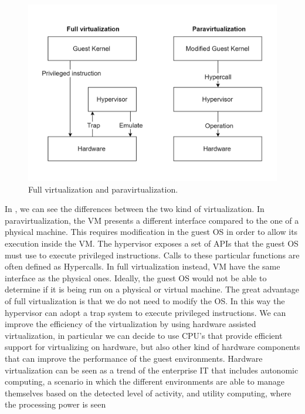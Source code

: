 \begin{figure}
	\centering
	\includegraphics[width=\columnwidth]{Images/virtualization_paravirtualization.pdf}  
	\caption[Full virtualization and paravirtualization]{Full virtualization and paravirtualization.}
	\label{fig:virtualizationParavirtualization}
\end{figure}
In , we can see the differences between the two kind
of virtualization. In paravirtualization, the VM presents a different
interface compared to the one of a physical machine. This requires
modification in the guest OS in order to allow its execution inside
the VM. The hypervisor exposes a set of APIs that the guest OS must
use to execute privileged instructions. Calls to these particular functions are often defined as Hypercalls. In full virtualization instead, VM have the same interface as the physical ones. Ideally, the guest OS would not be able to determine if it is being
run on a physical or virtual machine. The great advantage of full
virtualization is that we do not need to modify the OS. In this way
the hypervisor can adopt a trap system to execute privileged
instructions. We can improve the efficiency of the virtualization by using hardware assisted virtualization, in particular we can decide to use CPU's that
provide efficient support for virtualizing on hardware, but also other
kind of hardware components that can improve the performance of
the guest environments.
Hardware virtualization can be seen as a trend of the enterprise IT
that includes autonomic computing, a scenario in which the different
environments are able to manage themselves based on the detected level of 
activity, and utility computing, where the processing power is seen
